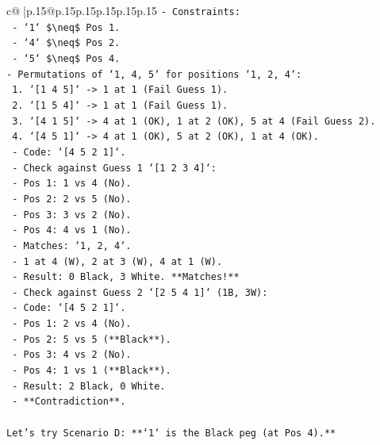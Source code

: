 \documentclass{article}
\begin{document}
{\begin{supertabular}{c@{$\;$}|p{.15\linewidth}@{}p{.15\linewidth}p{.15\linewidth}p{.15\linewidth}p{.15\linewidth}p{.15\linewidth}}
{{{\texttt{{-} Constraints:} \\
\texttt{    {-} `1` \$\textbackslash{}neq\$ Pos 1.} \\
\texttt{    {-} `4` \$\textbackslash{}neq\$ Pos 2.} \\
\texttt{    {-} `5` \$\textbackslash{}neq\$ Pos 4.} \\
\texttt{{-} Permutations of `1, 4, 5` for positions `1, 2, 4`:} \\
\texttt{    1. `{[}1 4 5{]}` {-}> 1 at 1 (Fail Guess 1).} \\
\texttt{    2. `{[}1 5 4{]}` {-}> 1 at 1 (Fail Guess 1).} \\
\texttt{    3. `{[}4 1 5{]}` {-}> 4 at 1 (OK), 1 at 2 (OK), 5 at 4 (Fail Guess 2).} \\
\texttt{    4. `{[}4 5 1{]}` {-}> 4 at 1 (OK), 5 at 2 (OK), 1 at 4 (OK).} \\
\texttt{       {-} Code: `{[}4 5 2 1{]}`.} \\
\texttt{       {-} Check against Guess 1 `{[}1 2 3 4{]}`:} \\
\texttt{         {-} Pos 1: 1 vs 4 (No).} \\
\texttt{         {-} Pos 2: 2 vs 5 (No).} \\
\texttt{         {-} Pos 3: 3 vs 2 (No).} \\
\texttt{         {-} Pos 4: 4 vs 1 (No).} \\
\texttt{         {-} Matches: `1, 2, 4`.} \\
\texttt{         {-} 1 at 4 (W), 2 at 3 (W), 4 at 1 (W).} \\
\texttt{         {-} Result: 0 Black, 3 White. **Matches!**} \\
\texttt{       {-} Check against Guess 2 `{[}2 5 4 1{]}` (1B, 3W):} \\
\texttt{         {-} Code: `{[}4 5 2 1{]}`.} \\
\texttt{         {-} Pos 1: 2 vs 4 (No).} \\
\texttt{         {-} Pos 2: 5 vs 5 (**Black**).} \\
\texttt{         {-} Pos 3: 4 vs 2 (No).} \\
\texttt{         {-} Pos 4: 1 vs 1 (**Black**).} \\
\texttt{         {-} Result: 2 Black, 0 White.} \\
\texttt{         {-} **Contradiction**.} \\
\\ 
\texttt{Let's try Scenario D: **`1` is the Black peg (at Pos 4).**} \\
}}}
\end{supertabular}}
\end{document}
